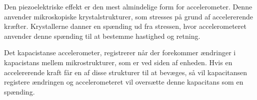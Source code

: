 Den piezoelektriske effekt er den mest almindelige form for accelerometer. Denne anvender mikroskopiske krystalstrukturer, som stresses på grund af accelererende kræfter. Krystallerne danner en spænding ud fra stressen, hvor accelerometeret anvender denne spænding til at bestemme hastighed og retning.

Det kapacistanse accelerometer, registrerer når der forekommer ændringer i kapacistans mellem mikrostrukturer, som er ved siden af enheden. Hvis en accelererende kraft får en af disse strukturer til at bevæges, så vil kapacitansen registere ændringen og accelerometeret vil oversætte denne kapacitans som en spænding.  \citep{Goodrich2013}
